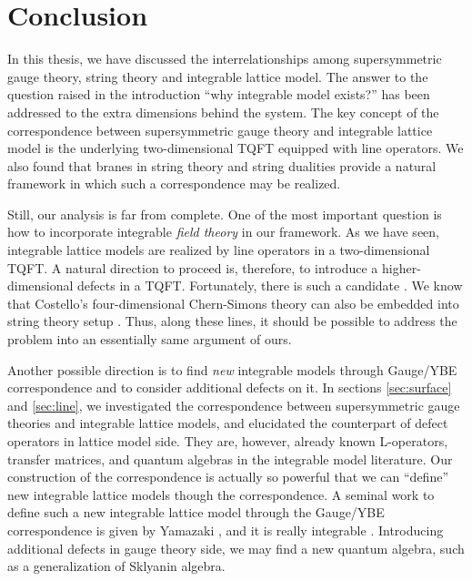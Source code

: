 \begin{comment}
\documentclass[11pt]{article}  %
\usepackage{Common/toshi}

\end{comment}



\section{Conclusion}
\label{sec:discussion}

In this thesis, we have discussed the interrelationships
among supersymmetric gauge theory, string theory and integrable
lattice model. The answer to the question raised in
the introduction ``why integrable model exists?'' has been addressed to
the extra dimensions behind the system.
The key concept of the correspondence between supersymmetric gauge theory
and integrable lattice model is the underlying two-dimensional TQFT equipped
with line operators.
We also found that branes in string theory and string dualities
provide a natural framework in which such a
correspondence may be realized.


Still, our analysis is far from complete.
One of the most important question is how to incorporate integrable
\emph{field theory} in our framework.
As we have seen, integrable lattice models %
are realized by line operators in a two-dimensional TQFT.
A natural direction to proceed is, therefore, to
introduce a higher-dimensional defects in a TQFT.
Fortunately, there is such a candidate \cite{Costello:2019tri}.
We know that Costello's four-dimensional Chern-Simons theory can also
be embedded into string theory setup \cite{Costello:2018txb}.
Thus, along these lines, it should be possible to address the problem
into an essentially same argument of ours.


Another possible direction is to find \emph{new} integrable
models through Gauge/YBE correspondence and to consider additional defects on it.
In sections \ref{sec:surface} and \ref{sec:line}, we investigated
the correspondence between supersymmetric gauge theories and integrable
lattice models, and elucidated the counterpart of defect operators in
lattice model side.
They are, however, already known L-operators, transfer matrices, and
quantum algebras in the integrable model literature.
Our construction of the correspondence is actually so powerful that
we can ``define'' new integrable lattice models though the correspondence.
A seminal work to define such a new integrable lattice model through the
Gauge/YBE correspondence is given by Yamazaki \cite{Yamazaki:2013nra}, and
it is really integrable \cite{Kels:2015bda,Kels:2017toi,Kels:2017vbc}.
Introducing additional defects in gauge theory side, we may find a
new quantum algebra, such as a generalization of Sklyanin algebra.


